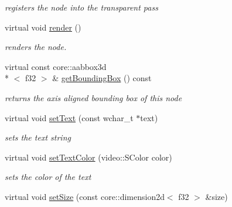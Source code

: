 \begin{DoxyCompactItemize}
\begin{DoxyCompactList}\small\item\em registers the node into the transparent pass \end{DoxyCompactList}\item 
virtual void \hyperlink{classirr_1_1scene_1_1_c_billboard_text_scene_node_a5c4ee43d10124167406b5c846a6b7b2b}{render} ()
\begin{DoxyCompactList}\small\item\em renders the node. \end{DoxyCompactList}\item 
\hypertarget{classirr_1_1scene_1_1_c_billboard_text_scene_node_a80eec65fe01d636e1125dc68cf8e8b2f}{virtual const core\-::aabbox3d\\*
$<$ f32 $>$ \& \hyperlink{classirr_1_1scene_1_1_c_billboard_text_scene_node_a80eec65fe01d636e1125dc68cf8e8b2f}{get\-Bounding\-Box} () const }\label{classirr_1_1scene_1_1_c_billboard_text_scene_node_a80eec65fe01d636e1125dc68cf8e8b2f}

\begin{DoxyCompactList}\small\item\em returns the axis aligned bounding box of this node \end{DoxyCompactList}\item 
\hypertarget{classirr_1_1scene_1_1_c_billboard_text_scene_node_ac430dec725e65b7ff67bab80e43f4331}{virtual void \hyperlink{classirr_1_1scene_1_1_c_billboard_text_scene_node_ac430dec725e65b7ff67bab80e43f4331}{set\-Text} (const wchar\-\_\-t $\ast$text)}\label{classirr_1_1scene_1_1_c_billboard_text_scene_node_ac430dec725e65b7ff67bab80e43f4331}

\begin{DoxyCompactList}\small\item\em sets the text string \end{DoxyCompactList}\item 
\hypertarget{classirr_1_1scene_1_1_c_billboard_text_scene_node_a4a1fc95ce72262e8dc62794cf4a95beb}{virtual void \hyperlink{classirr_1_1scene_1_1_c_billboard_text_scene_node_a4a1fc95ce72262e8dc62794cf4a95beb}{set\-Text\-Color} (video\-::\-S\-Color color)}\label{classirr_1_1scene_1_1_c_billboard_text_scene_node_a4a1fc95ce72262e8dc62794cf4a95beb}

\begin{DoxyCompactList}\small\item\em sets the color of the text \end{DoxyCompactList}\item 
\hypertarget{classirr_1_1scene_1_1_c_billboard_text_scene_node_af82548e9576ff6c262fb7fcc9e46eaba}{virtual void \hyperlink{classirr_1_1scene_1_1_c_billboard_text_scene_node_af82548e9576ff6c262fb7fcc9e46eaba}{set\-Size} (const core\-::dimension2d$<$ f32 $>$ \&size)}\label{classirr_1_1scene_1_1_c_billboard_text_scene_node_af82548e9576ff6c262fb7fcc9e46eaba}


\end{DoxyCompactItemize}
